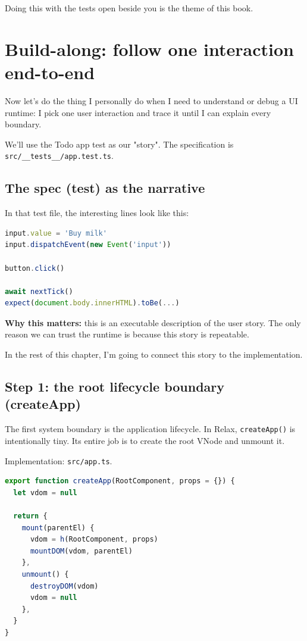 Doing this with the tests open beside you is the theme of this book.

\section{Build-along: follow one interaction end-to-end}
Now let's do the thing I personally do when I need to understand or debug a UI runtime:
I pick one user interaction and trace it until I can explain every boundary.

We'll use the Todo app test as our "story".
The specification is \texttt{src/\_\_tests\_\_/app.test.ts}.

\subsection{The spec (test) as the narrative}
In that test file, the interesting lines look like this:

\begin{lstlisting}[style=relax,language=JavaScript]
input.value = 'Buy milk'
input.dispatchEvent(new Event('input'))

button.click()

await nextTick()
expect(document.body.innerHTML).toBe(...)
\end{lstlisting}

\textbf{Why this matters:}
this is an executable description of the user story.
The only reason we can trust the runtime is because this story is repeatable.

In the rest of this chapter, I’m going to connect this story to the implementation.

\subsection{Step 1: the root lifecycle boundary (createApp)}
The first system boundary is the application lifecycle.
In Relax, \texttt{createApp()} is intentionally tiny.
Its entire job is to create the root VNode and unmount it.

Implementation: \texttt{src/app.ts}.

\begin{lstlisting}[style=relax,language=JavaScript]
export function createApp(RootComponent, props = {}) {
  let vdom = null

  return {
    mount(parentEl) {
      vdom = h(RootComponent, props)
      mountDOM(vdom, parentEl)
    },
    unmount() {
      destroyDOM(vdom)
      vdom = null
    },
  }
}
\end{lstlisting}

